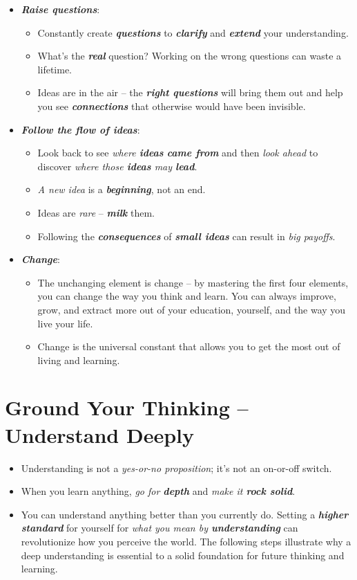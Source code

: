 \documentclass[11pt]{article}
\begin{document}
\begin{itemize}
\item \emph{\textbf{Raise questions}}:
\begin{itemize}
\item Constantly create \emph{\textbf{questions}} to \emph{\textbf{clarify}} and \emph{\textbf{extend}} your understanding. 
\item What’s the \emph{\textbf{real}} question? Working on the wrong questions can waste a lifetime.
\item Ideas are in the air -- the \emph{\textbf{right questions}} will bring them out and help you see \emph{\textbf{connections}} that otherwise would have been invisible.
\end{itemize}

\item \emph{\textbf{Follow the flow of ideas}}:
\begin{itemize}
\item Look back to see \emph{where \textbf{ideas} \textbf{came from}} and then \emph{look ahead} to discover \emph{where those \textbf{ideas} may \textbf{lead}}. 
\item \emph{A new idea} is a \emph{\textbf{beginning}}, not an end. 
\item Ideas are \emph{rare} -- \emph{\textbf{milk}} them. 
\item Following the \emph{\textbf{consequences}} of \emph{\textbf{small ideas}} can result in \emph{big payoffs}.
\end{itemize}

\item \emph{\textbf{Change}}:
\begin{itemize}
\item The unchanging element is change -- by mastering the first four elements, you can change the way you think and learn. You can always improve, grow, and extract more out of your education, yourself, and the way you live your life. 
\item Change is the universal constant that allows you to get the most out of living and learning.
\end{itemize}
\end{itemize}

\section{Ground Your Thinking -- Understand Deeply}
\begin{itemize}
\item Understanding is not a \emph{yes-or-no proposition}; it’s not an on-or-off switch. 

\item When you learn anything, \emph{go for \textbf{depth}} and \emph{make it \textbf{rock solid}}. 

\item You can understand anything better than you currently do. Setting a \emph{\textbf{higher standard}} for yourself for \emph{what you mean by \textbf{understanding}} can revolutionize how you perceive the world. The following steps illustrate why a deep understanding is essential to a solid foundation for future thinking and learning.
\end{itemize}
\end{document}
